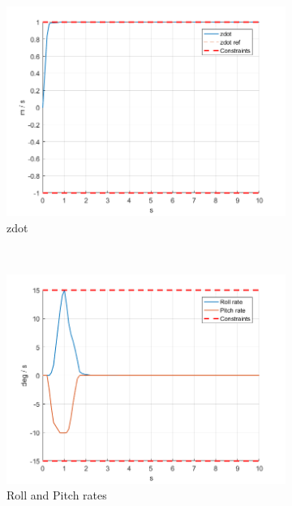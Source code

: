 \documentclass[11pt]{article}
\begin{document}
\begin{enumerate}
\begin{figure}[ht]
        \begin{subfigure}[c]{0.3\linewidth}
            \centering
            \includegraphics[width=\linewidth]{Plots_05_ReferenceTracking_Constant/04}
            \caption{zdot}
        \end{subfigure}
        ~
        \begin{subfigure}[c]{0.3\linewidth}
            \centering
            \includegraphics[width=\linewidth]{Plots_05_ReferenceTracking_Constant/05}
            \caption{Roll and Pitch rates}
        \end{subfigure}
        ~
        \begin{subfigure}[c]{0.3\linewidth}
            \centering

\end{subfigure}
\end{figure}
\end{enumerate}
\end{document}
